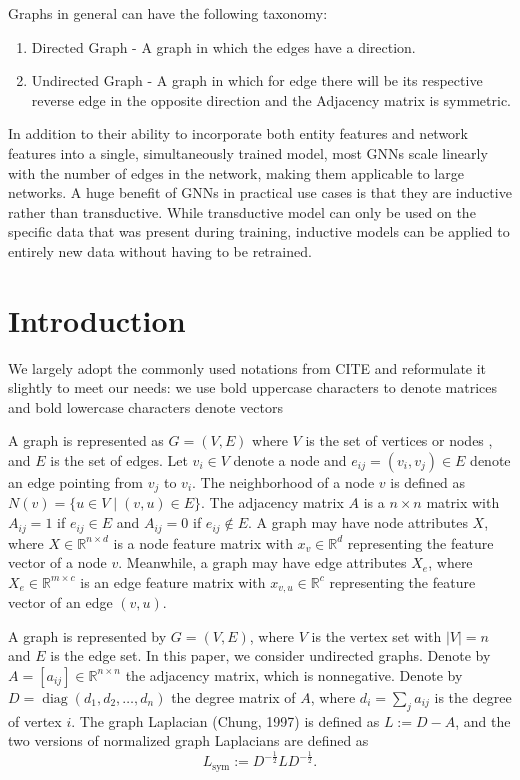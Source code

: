 \documentclass{report} %
\begin{document}
Graphs in general can have the following taxonomy: \cite{GNN-2019}

\begin{enumerate}
    \item Directed Graph - A graph in which the edges have a direction.
    \item Undirected Graph - A graph in which for edge there will be its respective reverse edge in the opposite direction and the Adjacency matrix is symmetric.
\end{enumerate}

In addition to their ability to incorporate both entity features and network features into a single, simultaneously trained model, most GNNs scale linearly with the number of edges in the network, making them applicable to large
networks. A huge benefit of GNNs in practical use cases is that they are inductive rather than transductive. While transductive model can only be used on the specific data that was present during training, 
inductive models can be applied to entirely new data without having to be retrained. \cite{ML HGNN-2023}

\section{Introduction}\label{sec:Introduction}


We largely adopt the commonly used notations from CITE and reformulate it slightly to meet our needs:
we use bold uppercase characters to
denote matrices and bold lowercase characters denote vectors

A graph is represented as \( G = (V, E) \) where \( V \) is the set of vertices or nodes , and \( E \) is the set of edges. 
Let \( v_i \in V \) denote a node and \( e_{ij} = (v_i, v_j) \in E \) denote an edge pointing from \( v_j \) to \( v_i \). 
The neighborhood of a node \( v \) is defined as \( N(v) = \{ u \in V \mid (v, u) \in E \} \).
The adjacency matrix \( A \) is a \( n \times n \) matrix with \( A_{ij} = 1 \) if \( e_{ij} \in E \) and \( A_{ij} = 0 \) if \( e_{ij} \notin E \). 
A graph may have node attributes \( X \), where \( X \in \mathbb{R}^{n \times d} \) is a node feature matrix with \( x_v \in \mathbb{R}^d \)
representing the feature vector of a node \( v \). 
Meanwhile, a graph may have edge attributes \( X_e \), where \( X_e \in \mathbb{R}^{m \times c} \) is an edge
feature matrix with \( x_{v,u} \in \mathbb{R}^c \) representing the feature vector of an edge \( (v, u) \).

A graph is represented by \( G = (V, E) \), where \( V \)
is the vertex set with \( |V| = n \) and \( E \) is the edge set.
In this paper, we consider undirected graphs. Denote by
\( A = [a_{ij}] \in \mathbb{R}^{n \times n} \) the adjacency matrix, which is nonnegative. 
Denote by \( D = \operatorname{diag}(d_1, d_2, \dots, d_n) \) the degree matrix
of \( A \), where \( d_i = \sum_{j} a_{ij} \) is the degree of vertex \( i \).
The graph Laplacian (Chung, 1997) is defined as \( L := D - A \), and the
two versions of normalized graph Laplacians are defined as
\[
L_{\text{sym}} := D^{-\frac{1}{2}} L D^{-\frac{1}{2}}.
\]
\end{document}
